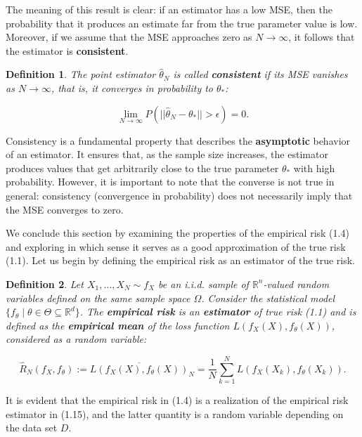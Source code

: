 \documentclass{report}
\newtheorem{definition}{Definition}[chapter]
\begin{document}
The meaning of this result is clear: if an estimator has a low MSE, then the probability that it produces an estimate far from the true parameter value is low. Moreover, if we assume that the MSE approaches zero as $N \to \infty$, it follows that the estimator is \textbf{consistent}.

\begin{definition}
The point estimator $\hat{\theta}_N$ is called \textbf{consistent} if its MSE vanishes as $N \to \infty$, that is, it converges in probability to $\theta_*$:

\begin{equation}
\lim_{N \to \infty} P(||\hat{\theta}_N -\theta_*|| > \epsilon) = 0.
\end{equation}
\end{definition}

Consistency is a fundamental property that describes the \textbf{asymptotic} behavior of an estimator. It ensures that, as the sample size increases, the estimator produces values that get arbitrarily close to the true parameter $\theta_*$ with high probability. However, it is important to note that the converse is not true in general: consistency (convergence in probability) does not necessarily imply that the MSE converges to zero.

We conclude this section by examining the properties of the empirical risk (1.4) and exploring in which sense it serves as a good approximation of the true risk (1.1). Let us begin by defining the empirical risk as an estimator of the true risk.

\begin{definition}
Let $X_1,\dots,X_N \sim f_X$ be an i.i.d. sample of $\mathbb{R}^n$-valued random variables defined on the same sample space $\Omega$. Consider the statistical model $\{f_\theta \mid \theta \in \Theta \subseteq \mathbb{R}^d\}$. The \textbf{empirical risk} is an \textbf{estimator} of true risk (1.1) and is defined as the \textbf{empirical mean} of the loss function $L(f_X(X), f_\theta(X))$, considered as a random variable:

\begin{equation}
\hat{R}_N(f_X,f_\theta) := \overline{L(f_X(X),f_\theta(X))}_N = \frac{1}{N}\sum_{k=1}^{N}L(f_X(X_k),f_\theta(X_k)).
\end{equation}
\end{definition}

It is evident that the empirical risk in (1.4) is a realization of the empirical risk estimator in (1.15), and the latter quantity is a random variable depending on the data set $D$.
\end{document}

